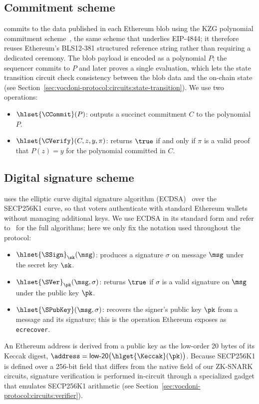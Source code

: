 \subsection{Commitment scheme}
\label{sec:cryptographic-primitives:commitments}

\davinci commits to the data published in each Ethereum blob using the KZG polynomial commitment scheme~\cite{kate2010constant}, the same scheme that underlies EIP-4844; it therefore reuses Ethereum's BLS12-381 structured reference string rather than requiring a dedicated ceremony. The blob payload is encoded as a polynomial $P$; the sequencer commits to $P$ and later proves a single evaluation, which lets the state transition circuit check consistency between the blob data and the on-chain state (see Section~\ref{sec:vocdoni-protocol:circuits:state-transition}). We use two operations:
\begin{itemize}
	\item $\hlset{\CCommit}(P)$: outputs a succinct commitment $C$ to the polynomial $P$.
	\item $\hlset{\CVerify}(C, z, y, \pi)$: returns $\true$ if and only if $\pi$ is a valid proof that $P(z) = y$ for the polynomial committed in $C$.
\end{itemize}

\subsection{Digital signature scheme}
\label{sec:cryptographic-primitives:signatures}

\Davinci uses the elliptic curve digital signature algorithm (ECDSA)~\cite{johnson2001ecdsa} over the SECP256K1 curve, so that voters authenticate with standard Ethereum wallets without managing additional keys. We use ECDSA in its standard form and refer to~\cite{johnson2001ecdsa} for the full algorithms; here we only fix the notation used throughout the protocol:
\begin{itemize}
	\item $\hlset{\SSign}_{\sk}(\msg)$: produces a signature $\sigma$ on message $\msg$ under the secret key $\sk$.
	\item $\hlset{\SVer}_{\pk}(\msg, \sigma)$: returns $\true$ if $\sigma$ is a valid signature on $\msg$ under the public key $\pk$.
	\item $\hlset{\SPubKey}(\msg, \sigma)$: recovers the signer's public key $\pk$ from a message and its signature; this is the operation Ethereum exposes as \texttt{ecrecover}.
\end{itemize}
An Ethereum address is derived from a public key as the low-order 20 bytes of its Keccak digest, $\address = \mathsf{low\text{-}20}\bigl(\hlget{\Keccak}(\pk)\bigr)$. Because SECP256K1 is defined over a 256-bit field that differs from the native field of our \ac{ZK-SNARK} circuits, signature verification is performed in-circuit through a specialized gadget that emulates SECP256K1 arithmetic (see Section~\ref{sec:vocdoni-protocol:circuits:verifier}).

